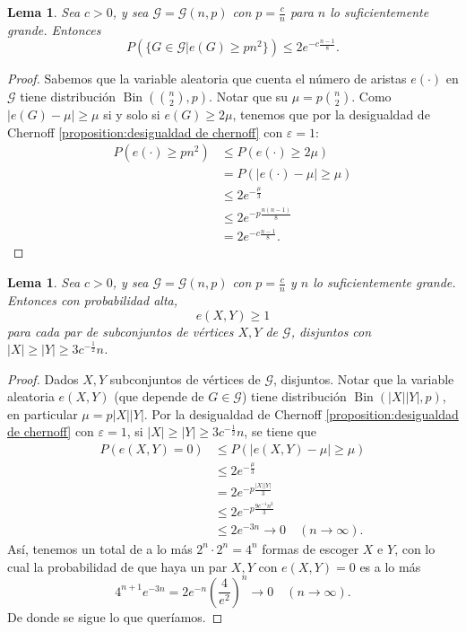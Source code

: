 \documentclass[12pt]{report}
\theoremstyle{plain}
\newtheorem{lemma}[theorem]{Lema}
\theoremstyle{definition}
\newcommand{\abs}[1]{\left \vert #1 \right \vert}
\begin{document}
\begin{lemma}
Sea $c > 0$, y sea $\mathcal G = \mathcal G (n,p)$ con $p = \frac c n$ para $n$ lo suficientemente grande. Entonces
\[
    P\left (\{G \in \mathcal G | e(G) \geq p n^2\} \right ) \leq 2e^{- c \frac {n-1} 8}.
\]
\end{lemma}
\begin{proof}
Sabemos que la variable aleatoria que cuenta el número de aristas $e(\cdot) $ en $\mathcal G$ tiene distribución $\operatorname{Bin} (\binom n 2 , p)$. Notar que su $\mu = p \binom n2$. Como $\abs {e(G) - \mu} \geq \mu$ si y solo si $e(G) \geq 2 \mu$, tenemos que por la desigualdad de Chernoff \ref{proposition:desigualdad de chernoff} con $\varepsilon = 1$:
\begin{align*}
P(e(\cdot) \geq p n^2) &\leq P (e(\cdot ) \geq 2 \mu) \\
&= P(\abs{e(\cdot) - \mu} \geq \mu)  \\
&\leq 2 e^{- \frac \mu 3} \\
&\leq 2 e^{- p \frac{n (n-1)}{8}} \\
&= 2e^{- c \frac {n-1} 8}.
\end{align*}
\end{proof}


\begin{lemma}
Sea $c > 0$, y sea $\mathcal G = \mathcal G (n,p)$ con $p = \frac c n$ y $n$ lo suficientemente grande. Entonces con probabilidad alta,
\[
    e(X,Y) \geq 1
\]
para cada par de subconjuntos de vértices $X,Y$ de $\mathcal G$, disjuntos con $\abs X \geq \abs Y \geq 3 c^{-\frac 1 2} n$.
\end{lemma}
\begin{proof}
Dados $X,Y$ subconjuntos de vértices de $\mathcal G$, disjuntos. Notar que la variable aleatoria $e(X,Y)$ (que depende de $G \in \mathcal G$) tiene distribución $\operatorname{Bin}(\abs X \abs Y, p)$, en particular $\mu = p \abs X \abs Y$. Por la desigualdad de Chernoff \ref{proposition:desigualdad de chernoff} con $\varepsilon = 1$, si $\abs X \geq \abs Y \geq 3 c^{-\frac 1 2}n$, se tiene que
\begin{align*}
P(e(X,Y) = 0) &\leq P(\abs{e(X,Y) -  \mu} \geq \mu) \\
&\leq 2 e^{- \frac \mu 3} \\
&= 2 e^{-p \frac{\abs X \abs Y}{3}} \\
&\leq 2 e^{-p \frac{9 c^{-1} n^2}{3}} \\
&\leq 2 e^{- 3 n}  \longrightarrow 0 \quad (n \to \infty).
\end{align*}
Así, tenemos un total de a lo más $2^n \cdot 2^n = 4^n$ formas de escoger $X$ e $Y$, con lo cual la probabilidad de que haya un par $X,Y$ con $e(X,Y) = 0$ es a lo más
\[
    4^{n+1} e^{-3n} = 2e^{-n} \left (\frac 4 {e^2} \right)^n \longrightarrow 0 \quad (n \to \infty).
\]
De donde se sigue lo que queríamos.
\end{proof}
\end{document}
